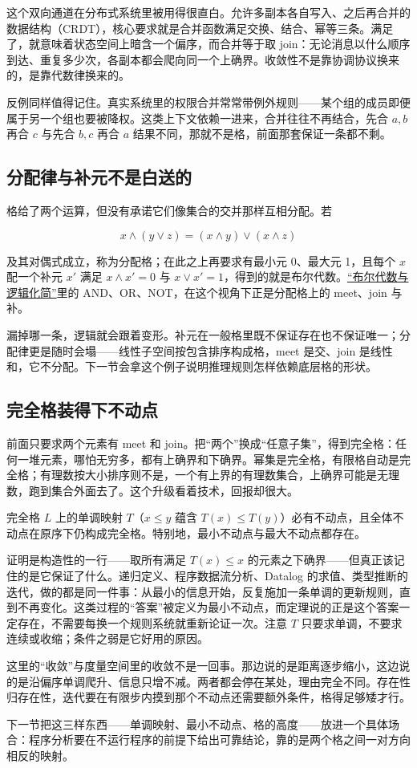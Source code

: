 这个双向通道在分布式系统里被用得很直白。允许多副本各自写入、之后再合并的数据结构（CRDT），核心要求就是合并函数满足交换、结合、幂等三条。满足了，就意味着状态空间上暗含一个偏序，而合并等于取 join：无论消息以什么顺序到达、重复多少次，各副本都会爬向同一个上确界。收敛性不是靠协调协议换来的，是靠代数律换来的。

反例同样值得记住。真实系统里的权限合并常常带例外规则——某个组的成员即便属于另一个组也要被降权。这类上下文依赖一进来，合并往往不再结合，先合 \(a,b\) 再合 \(c\) 与先合 \(b,c\) 再合 \(a\) 结果不同，那就不是格，前面那套保证一条都不剩。

\subsection{分配律与补元不是白送的}

格给了两个运算，但没有承诺它们像集合的交并那样互相分配。若

\[
x\wedge(y\vee z)=(x\wedge y)\vee(x\wedge z)
\]

及其对偶式成立，称为分配格；在此之上再要求有最小元 0、最大元 1，且每个 \(x\) 配一个补元 \(x'\) 满足 \(x\wedge x'=0\) 与 \(x\vee x'=1\)，得到的就是布尔代数。\hyperref[sec:04-Discrete-Mathematics/07-Boolean-Algebra-and-Automata/01]{``布尔代数与逻辑化简''}里的 AND、OR、NOT，在这个视角下正是分配格上的 meet、join 与补。

漏掉哪一条，逻辑就会跟着变形。补元在一般格里既不保证存在也不保证唯一；分配律更是随时会塌——线性子空间按包含排序构成格，meet 是交、join 是线性和，它不分配。下一节会拿这个例子说明推理规则怎样依赖底层格的形状。

\subsection{完全格装得下不动点}

前面只要求两个元素有 meet 和 join。把``两个''换成``任意子集''，得到完全格：任何一堆元素，哪怕无穷多，都有上确界和下确界。幂集是完全格，有限格自动是完全格；有理数按大小排序则不是，一个有上界的有理数集合，上确界可能是无理数，跑到集合外面去了。这个升级看着技术，回报却很大。

\begin{theorem}
完全格 \(L\) 上的单调映射 \(T\)（\(x\le y\) 蕴含 \(T(x)\le T(y)\)）必有不动点，且全体不动点在原序下仍构成完全格。特别地，最小不动点与最大不动点都存在。
\end{theorem}

证明是构造性的一行——取所有满足 \(T(x)\le x\) 的元素之下确界——但真正该记住的是它保证了什么。递归定义、程序数据流分析、Datalog 的求值、类型推断的迭代，做的都是同一件事：从最小的信息开始，反复施加一条单调的更新规则，直到不再变化。这类过程的``答案''被定义为最小不动点，而定理说的正是这个答案一定存在，不需要每换一个规则系统就重新论证一次。注意 \(T\) 只要求单调，不要求连续或收缩；条件之弱是它好用的原因。

这里的``收敛''与度量空间里的收敛不是一回事。那边说的是距离逐步缩小，这边说的是沿偏序单调爬升、信息只增不减。两者都会停在某处，理由完全不同。存在性归存在性，迭代要在有限步内摸到那个不动点还需要额外条件，格得足够矮才行。

下一节把这三样东西——单调映射、最小不动点、格的高度——放进一个具体场合：程序分析要在不运行程序的前提下给出可靠结论，靠的是两个格之间一对方向相反的映射。
